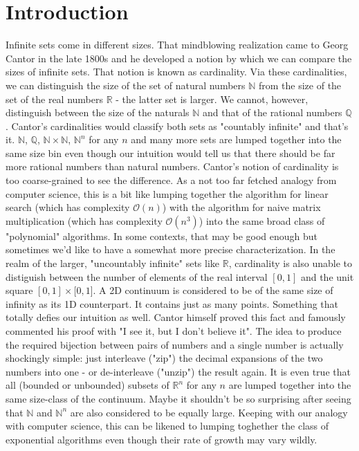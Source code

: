 \documentclass[12pt]{article}
\begin{document}
\section{Introduction}
Infinite sets come in different sizes. That mindblowing realization came to Georg Cantor in the late 1800s and he developed a notion by which we can compare the sizes of infinite sets. That notion is known as cardinality. Via these cardinalities, we can distinguish the size of the set of natural numbers $\mathbb{N}$ from the size of the set of the real numbers $\mathbb{R}$ - the latter set is larger. We cannot, however, distinguish between the size of the naturals $\mathbb{N}$ and that of the rational numbers $\mathbb{Q}$. Cantor's cardinalities would classify both sets as "countably infinite" and that's it. $\mathbb{N}$, $\mathbb{Q}$, $\mathbb{N} \times \mathbb{N}$, $\mathbb{N}^n$ for any $n$ and many more sets are lumped together into the same size bin even though our intuition would tell us that there should be far more rational numbers than natural numbers. Cantor's notion of cardinality is too coarse-grained to see the difference. As a not too far fetched analogy from computer science, this is a bit like lumping together the algorithm for linear search (which has complexity $\mathcal{O}(n)$) with the algorithm for naive matrix multiplication (which has complexity $\mathcal{O}(n^3)$) into the same broad class of "polynomial" algorithms. In some contexts, that may be good enough but sometimes we'd like to have a somewhat more precise characterization. In the realm of the larger, "uncountably infinite" sets like $\mathbb{R}$, cardinality is also unable to distiguish between the number of elements of the real interval $[0,1]$ and the unit square $[0,1] \times [0,1$]. A 2D continuum is considered to be of the same size of infinity as its 1D counterpart. It contains just as many points. Something that totally defies our intuition as well. Cantor himself proved this fact and famously commented his proof with "I see it, but I don't believe it". The idea to produce the required bijection between pairs of numbers and a single number is actually shockingly simple: just interleave ("zip") the decimal expansions of the two numbers into one - or de-interleave ("unzip") the result again. It is even true that all (bounded or unbounded) subsets of $\mathbb{R}^n$ for any $n$ are lumped together into the same size-class of the continuum. Maybe it shouldn't be so surprising after seeing that $\mathbb{N}$ and $\mathbb{N}^n$ are also considered to be equally large. Keeping with our analogy with computer science, this can be likened to lumping toghether the class of exponential algorithms even though their rate of growth may vary wildly.
\end{document}
